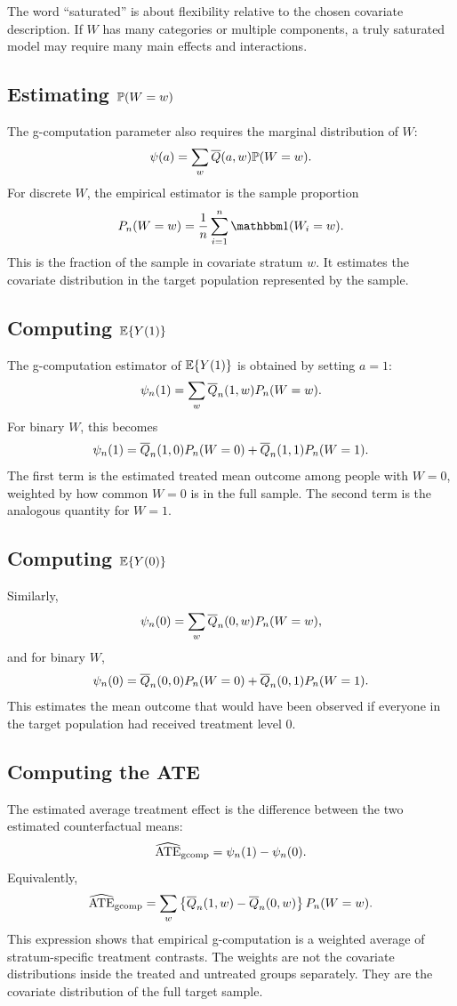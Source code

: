 \begin{remark}
The word ``saturated'' is about flexibility relative to the chosen covariate
description. If $W$ has many categories or multiple components, a truly saturated
model may require many main effects and interactions.
\end{remark}

\subsection{Estimating $\mathbb{P}(W=w)$}

The g-computation parameter also requires the marginal distribution of $W$:
\[
\psi(a)=\sum_w \overline{Q}(a,w)\mathbb{P}(W=w).
\]
For discrete $W$, the empirical estimator is the sample proportion
\[
P_n(W=w)
=
\frac{1}{n}\sum_{i=1}^n \ind(W_i=w).
\]
This is the fraction of the sample in covariate stratum $w$. It estimates the covariate
distribution in the target population represented by the sample.

\subsection{Computing $\mathbb{E}\{Y(1)\}$}

The g-computation estimator of $\mathbb{E}\{Y(1)\}$ is obtained by setting $a=1$:
\[
\psi_n(1)
=
\sum_w \overline{Q}_n(1,w)P_n(W=w).
\]
For binary $W$, this becomes
\[
\psi_n(1)
=
\overline{Q}_n(1,0)P_n(W=0)+\overline{Q}_n(1,1)P_n(W=1).
\]
The first term is the estimated treated mean outcome among people with $W=0$,
weighted by how common $W=0$ is in the full sample. The second term is the analogous
quantity for $W=1$.

\subsection{Computing $\mathbb{E}\{Y(0)\}$}

Similarly,
\[
\psi_n(0)
=
\sum_w \overline{Q}_n(0,w)P_n(W=w),
\]
and for binary $W$,
\[
\psi_n(0)
=
\overline{Q}_n(0,0)P_n(W=0)+\overline{Q}_n(0,1)P_n(W=1).
\]
This estimates the mean outcome that would have been observed if everyone in the
target population had received treatment level $0$.

\subsection{Computing the ATE}

The estimated average treatment effect is the difference between the two estimated
counterfactual means:
\[
\widehat{\operatorname{ATE}}_{\mathrm{gcomp}}
=
\psi_n(1)-\psi_n(0).
\]
Equivalently,
\[
\widehat{\operatorname{ATE}}_{\mathrm{gcomp}}
=
\sum_w
\left\{
\overline{Q}_n(1,w)-\overline{Q}_n(0,w)
\right\}P_n(W=w).
\]
This expression shows that empirical g-computation is a weighted average of
stratum-specific treatment contrasts. The weights are not the covariate distributions
inside the treated and untreated groups separately. They are the covariate distribution
of the full target sample.


